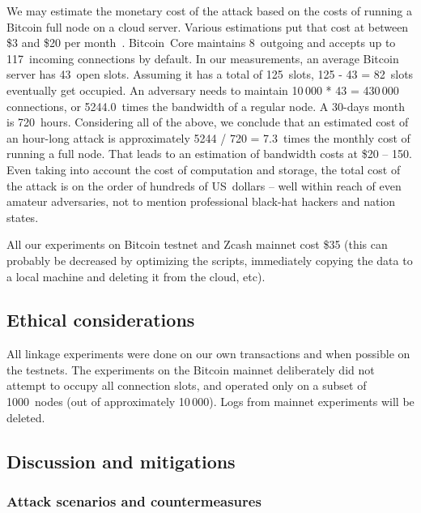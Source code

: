 We may estimate the monetary cost of the attack based on the costs of running a Bitcoin full node on a cloud server.
Various estimations put that cost at between \$3 and \$20 per month~\cite{Zeyde2018, Connell2017}.
Bitcoin~Core maintains 8~outgoing and accepts up to 117~incoming connections by default.
In our measurements, an average Bitcoin server has 43~open slots.
Assuming it has a total of 125~slots, 125 - 43 = 82~slots eventually get occupied.
An adversary needs to maintain 10\,000 * 43 = 430\,000 connections, or 5244.0~times the bandwidth of a regular node.
A 30-days month is 720~hours.
Considering all of the above, we conclude that an estimated cost of an hour-long attack is approximately 5244 / 720 = 7.3~times the monthly cost of running a full node.
That leads to an estimation of bandwidth costs at \$20 -- 150.
Even taking into account the cost of computation and storage, the total cost of the attack is on the order of hundreds of US~dollars -- well within reach of even amateur adversaries, not to mention professional black-hat hackers and nation states.

All our experiments on Bitcoin testnet and Zcash mainnet cost \$35 (this can probably be decreased by optimizing the scripts, immediately copying the data to a local machine and deleting it from the cloud, etc).

\subsection{Ethical considerations}
All linkage experiments were done on our own transactions and when possible on the testnets.
The experiments on the Bitcoin mainnet deliberately did not attempt to occupy all connection slots, and operated only on a subset of 1000~nodes (out of approximately 10\,000).
Logs from mainnet experiments will be deleted.

\subsection{Discussion and mitigations}

\subsubsection{Attack scenarios and countermeasures}


